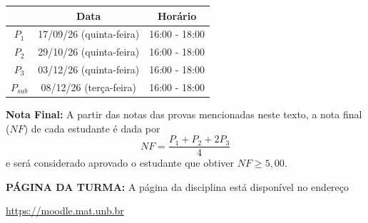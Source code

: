 \documentclass{beamer}
\begin{document}
\begin{frame}

    \begin{center}
        \begin{tabular}{c|c|c}
            \hline\hline
            \hspace{1cm}{\bf Prova} & {\bf Data}                          & {\bf Horário} \\
            \hline\hline
            $P_1$                   & 17/09/26 (quinta-feira) \phantom{x} & 16:00 - 18:00 \\
            \hline
            $P_2$                   & 29/10/26 (quinta-feira) \phantom{x} & 16:00 - 18:00 \\
            \hline
            $P_3$                   & 03/12/26 (quinta-feira) \phantom{x} & 16:00 - 18:00 \\
            \hline
            $P_{sub}$               & 08/12/26 (terça-feira) \phantom{x}  & 16:00 - 18:00 \\
            \hline\hline
        \end{tabular}
    \end{center}
\end{frame}

\begin{frame}

    {\bf Nota Final:} A partir das notas das provas mencionadas neste texto, a nota final ($NF$) de cada estudante é dada
    por
    \vspace{-0.15cm}
    \[
        NF = \frac{ P_1 + P_2 + 2P_3}{4}
    \]
    e será considerado aprovado o estudante que obtiver $NF \geq 5,00$.
\end{frame}

\begin{frame}
    {\bf{PÁGINA DA TURMA:}} A página da disciplina está disponível no endereço
    \begin{center}
        \href{https://moodle.mat.unb.br/course/view.php?id=65}{https://moodle.mat.unb.br}
    \end{center}
\end{frame}
\end{document}
